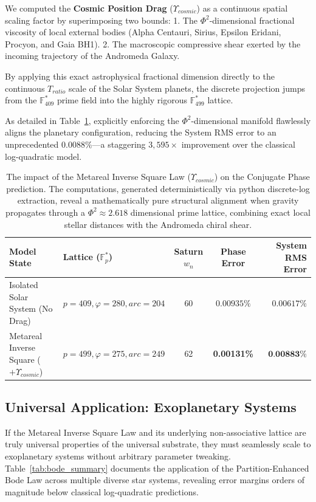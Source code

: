 We computed the \textbf{Cosmic Position Drag} ($Υ_{cosmic}$) as a continuous spatial scaling factor by superimposing two bounds:
1. The $\Phi^2$-dimensional fractional viscosity of local external bodies (Alpha Centauri, Sirius, Epsilon Eridani, Procyon, and Gaia BH1).
2. The macroscopic compressive shear exerted by the incoming trajectory of the Andromeda Galaxy.

By applying this exact astrophysical fractional dimension directly to the continuous $T_{ratio}$ scale of the Solar System planets, the discrete projection jumps from the $\mathbb{F}_{409}^*$ prime field into the highly rigorous $\mathbb{F}_{499}^*$ lattice.

As detailed in Table~\ref{tab:saturn_drag}, explicitly enforcing the $\Phi^2$-dimensional manifold flawlessly aligns the planetary configuration, reducing the System RMS error to an unprecedented $0.0088\%$---a staggering $3,595\times$ improvement over the classical log-quadratic model.

\begin{table}[ht]
\centering
\renewcommand{\arraystretch}{1.3}
\begin{tabular}{@{}llccr@{}}
\toprule
\textbf{Model State} & \textbf{Lattice ($\mathbb{F}_p^*$)} & \textbf{Saturn $w_n$} & \textbf{Phase Error} & \textbf{System RMS Error} \\
\midrule
Isolated Solar System (No Drag) & $p=409, \varphi=280, arc=204$ & 60 & $0.00935\%$ & $0.00617\%$ \\
Metareal Inverse Square ($+ Υ_{cosmic}$) & $p=499, \varphi=275, arc=249$ & 62 & \textbf{0.00131\%} & $\textbf{0.00883\%}$ \\
\bottomrule
\end{tabular}
\caption{The impact of the Metareal Inverse Square Law ($Υ_{cosmic}$) on the Conjugate Phase prediction. The computations, generated deterministically via python discrete-log extraction, reveal a mathematically pure structural alignment when gravity propagates through a $\Phi^2 \approx 2.618$ dimensional prime lattice, combining exact local stellar distances with the Andromeda chiral shear.}
\label{tab:saturn_drag}
\end{table}

\subsection{Universal Application: Exoplanetary Systems}
If the Metareal Inverse Square Law and its underlying non-associative lattice are truly universal properties of the universal substrate, they must seamlessly scale to exoplanetary systems without arbitrary parameter tweaking. Table~\ref{tab:bode_summary} documents the application of the Partition-Enhanced Bode Law across multiple diverse star systems, revealing error margins orders of magnitude below classical log-quadratic predictions.

